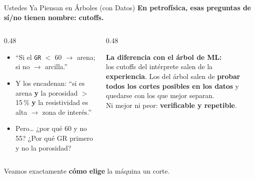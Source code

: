 \documentclass[aspectratio=169, 11pt]{beamer}
\begin{document}
\begin{frame}[shrink=8]{Ustedes Ya Piensan en Árboles (con Datos)}
  \vspace{-4pt}
  {\small\color{arcaDark}\bfseries
    En petrofísica, esas preguntas de sí/no tienen nombre: \textbf{cutoffs}.}

  \vspace{8pt}
  \begin{columns}[T]
    \begin{column}{0.48\textwidth}
      {\footnotesize\color{textMuted}
      \begin{itemize}\setlength{\itemsep}{7pt}
        \item[{\color{arcaRed}\scriptsize\faCodeBranch}]
          ``Si el \texttt{GR} \(<\) 60 \(\to\) arena; si no \(\to\) arcilla.''
        \item[{\color{arcaRed}\scriptsize\faCodeBranch}]
          Y los encadenan: ``si es arena \textbf{y} la porosidad
          \(>\) 15\,\% \textbf{y} la resistividad es alta
          \(\to\) zona de interés.''
        \item[{\color{arcaRed}\scriptsize\faQuestion}]
          Pero\ldots{} ¿por qué 60 y no 55? ¿Por qué GR primero
          y no la porosidad?
      \end{itemize}
      }
    \end{column}
    \begin{column}{0.48\textwidth}
      \begin{tcolorbox}[colback=arcaGray, colframe=arcaRed, boxrule=0pt, leftrule=3pt,
        arc=3pt, left=6pt, right=6pt, top=5pt, bottom=5pt]
        {\scriptsize\color{arcaDark}\bfseries La diferencia con el árbol de ML:}\\[4pt]
        {\scriptsize\color{textMuted}
          los cutoffs del intérprete salen de la
          \textbf{experiencia}. Los del árbol salen de
          \textbf{probar todos los cortes posibles en los
          datos} y quedarse con los que mejor separan.\\[4pt]
          Ni mejor ni peor: \textbf{verificable y repetible}.}
      \end{tcolorbox}
    \end{column}
  \end{columns}

  \vspace{8pt}
  \centering
  {\footnotesize\color{arcaDark}
    Veamos exactamente \textbf{cómo elige} la máquina un corte.}
\end{frame}
\end{document}
